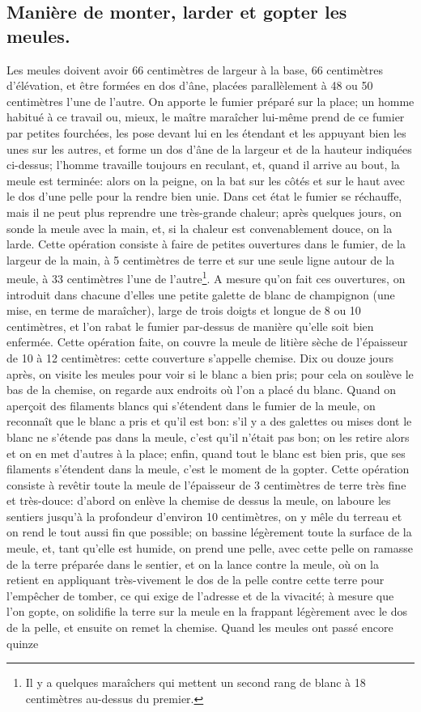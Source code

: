 \documentclass[10pt,a4paper]{book}
\begin{document}
\subsection{Manière de monter, larder et gopter les meules.}

Les meules doivent avoir 66 centimètres de largeur à la base, 66 centimètres d'élévation, et être formées en dos d'âne, placées parallèlement à 48 ou 50 centimètres l'une de l'autre. On apporte le fumier préparé sur la place; un homme habitué à ce travail ou, mieux, le maître maraîcher lui-même prend de ce fumier par petites fourchées, les pose devant lui en les étendant et les appuyant bien les unes sur les autres, et forme un dos d'âne de la largeur et de la hauteur indiquées ci-dessus; l'homme travaille toujours en reculant, et, quand il arrive au bout, la meule est terminée: alors on la peigne, on la bat sur les côtés et sur le haut avec le dos d'une pelle pour la rendre bien unie. Dans cet état le fumier se réchauffe, mais il ne peut plus reprendre une très-grande chaleur; après quelques jours, on sonde la meule avec la main, et, si la chaleur est convenablement douce, on la larde. Cette opération consiste à faire de petites ouvertures dans le fumier, de la largeur de la main, à 5 centimètres de terre et sur une seule ligne autour de la meule, à 33 centimètres l'une de l'autre\footnote{Il y a quelques maraîchers qui mettent un second rang de blanc à 18 centimètres au-dessus du premier.}. A mesure qu'on fait ces ouvertures, on introduit dans chacune d'elles une petite galette de blanc de champignon (une mise, en terme de maraîcher), large de trois doigts et longue de 8 ou 10 centimètres, et l'on rabat le fumier par-dessus de manière qu'elle soit bien enfermée. Cette opération faite, on couvre la meule de litière sèche de l'épaisseur de 10 à 12 centimètres: cette couverture s'appelle chemise. Dix ou douze jours après, on visite les meules pour voir si le blanc a bien pris; pour cela on soulève le bas de la chemise, on regarde aux endroits où l'on a placé du blanc. Quand on aperçoit des filaments blancs qui s'étendent dans le fumier de la meule, on reconnaît que le blanc a pris et qu'il est bon: s'il y a des galettes ou mises dont le blanc ne s'étende pas dans la meule, c'est qu'il n'était pas bon; on les retire alors et on en met d'autres à la place; enfin, quand tout le blanc est bien pris, que ses filaments s'étendent dans la meule, c'est le moment de la gopter. Cette opération consiste à revêtir toute la meule de l'épaisseur de 3 centimètres de terre très fine et très-douce: d'abord on enlève la chemise de dessus la meule, on laboure les sentiers jusqu'à la profondeur d'environ 10 centimètres, on y mêle du terreau et on rend le tout aussi fin que possible; on bassine légèrement toute la surface de la meule, et, tant qu'elle est humide, on prend une pelle, avec cette pelle on ramasse de la terre préparée dans le sentier, et on la lance contre la meule, où on la retient en appliquant très-vivement le dos de la pelle contre cette terre pour l'empêcher de tomber, ce qui exige de l'adresse et de la vivacité; à mesure que l'on gopte, on solidifie la terre sur la meule en la frappant légèrement avec le dos de la pelle, et ensuite on remet la chemise. Quand les meules ont passé encore quinze 
\end{document}
